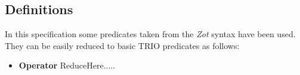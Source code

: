 \subsection{Definitions}

In this specification some predicates taken from the \textit{Zot} syntax have been used. They can be easily reduced to basic TRIO predicates as follows:
\begin {itemize}
\item \textbf{Operator} ReduceHere.....

\end {itemize}

